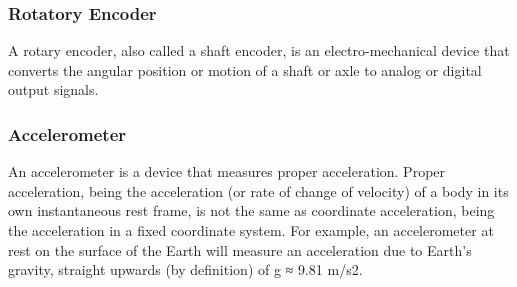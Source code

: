 \subsubsection{Rotatory Encoder}
A rotary encoder, also called a shaft encoder, is an electro-mechanical device that converts the
angular position or motion of a shaft or axle to analog or digital output signals.
\subsubsection{Accelerometer}
An accelerometer is a device that measures proper acceleration. Proper acceleration, being the
acceleration (or rate of change of velocity) of a body in its own instantaneous rest frame, is not the same as coordinate acceleration, being the acceleration in a fixed coordinate system.
For example, an accelerometer at rest on the surface of the Earth will measure an acceleration due
to Earth's gravity, straight upwards (by definition) of g ≈ 9.81 m/s2.
